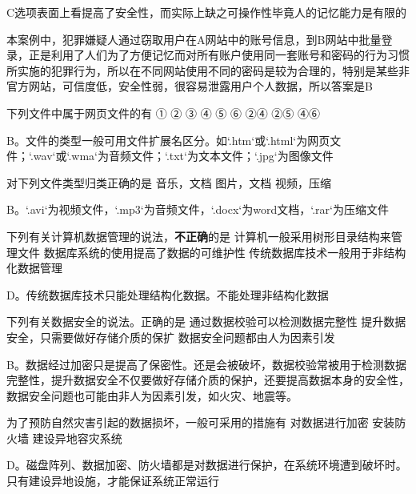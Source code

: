 \begin{groups}
\begin{questions}[rp]
\begin{solution}
C选项表面上看提高了安全性，而实际上缺之可操作性毕竟人的记忆能力是有限的

本案例中，犯罪嫌疑人通过窃取用户在A网站中的账号信息，到B网站中批量登录，正是利用了人们为了方便记忆而对所有账户使用同一套账号和密码的行为习惯所实施的犯罪行为，所以在不同网站使用不同的密码是较为合理的，特别是某些非官方网站，可信度低，安全性弱，很容易泄露用户个人数据，所以答案是B
\end{solution}

\question
{}下列文件中属于网页文件的有
① ② ③ ④ ⑤ ⑥
{②④}
{②⑤}
{④⑥}
\begin{solution}
B。文件的类型一般可用文件扩展名区分。如`.htm`或`.html`为网页文件；`.wav`或`.wma`为音频文件；`.txt`为文本文件；`.jpg`为图像文件
\end{solution}

\question
{}对下列文件类型归类正确的是
{音乐，文档}
{图片，文档}
{视频，压缩}
\begin{solution}
B。`.avi`为视频文件，`.mp3`为音频文件，`.docx`为word文档，`.rar`为压缩文件
\end{solution}

\question
{}下列有关计算机数据管理的说法，\textbf{不正确}的是
{计算机一般采用树形目录结构来管理文件}
{数据库系统的使用提高了数据的可维护性}
{传统数据库技术一般用于非结构化数据管理}
\begin{solution}
D。传统数据库技术只能处理结构化数据。不能处理非结构化数据
\end{solution}

\question
{}下列有关数据安全的说法。正确的是
{通过数据校验可以检测数据完整性}
{提升数据安全，只需要做好存储介质的保扩}
{数据安全问题都由人为因素引发}
\begin{solution}
B。数据经过加密只是提高了保密性。还是会被破坏，数据校验常被用于检测数据完整性，提升数据安全不仅要做好存储介质的保护，还要提高数据本身的安全性，数据安全问题也可能由非人为因素引发，如火灾、地震等。
\end{solution}

\question
{}为了预防自然灾害引起的数据损坏，一般可采用的措施有
{对数据进行加密}
{安装防火墙}
{建设异地容灾系统}
\begin{solution}
D。磁盘阵列、数据加密、防火墙都是对数据进行保护，在系统环境遭到破坏时。只有建设异地设施，才能保证系统正常运行
\end{solution}







\end{questions}
\end{groups}
